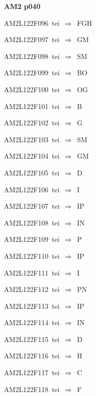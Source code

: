 \par\vfill\eject
{\bf\hfill AM2 p040\hfill\hbox{}}\par\bigskip
{\sixrm AM2L122F096\ {\sixit tei}\ }$\Rightarrow$\ FGH\par\smallskip
{\sixrm AM2L122F097\ {\sixit tei}\ }$\Rightarrow$\ GM\par\smallskip
{\sixrm AM2L122F098\ {\sixit tei}\ }$\Rightarrow$\ SM\par\smallskip
{\sixrm AM2L122F099\ {\sixit tei}\ }$\Rightarrow$\ BO\par\smallskip
{\sixrm AM2L122F100\ {\sixit tei}\ }$\Rightarrow$\ OG\par\smallskip
{\sixrm AM2L122F101\ {\sixit tei}\ }$\Rightarrow$\ B\par\smallskip
{\sixrm AM2L122F102\ {\sixit tei}\ }$\Rightarrow$\ G\par\smallskip
{\sixrm AM2L122F103\ {\sixit tei}\ }$\Rightarrow$\ SM\par\smallskip
{\sixrm AM2L122F104\ {\sixit tei}\ }$\Rightarrow$\ GM\par\smallskip
{\sixrm AM2L122F105\ {\sixit tei}\ }$\Rightarrow$\ D\par\smallskip
{\sixrm AM2L122F106\ {\sixit tei}\ }$\Rightarrow$\ I\par\smallskip
{\sixrm AM2L122F107\ {\sixit tei}\ }$\Rightarrow$\ IP\par\smallskip
{\sixrm AM2L122F108\ {\sixit tei}\ }$\Rightarrow$\ IN\par\smallskip
{\sixrm AM2L122F109\ {\sixit tei}\ }$\Rightarrow$\ P\par\smallskip
{\sixrm AM2L122F110\ {\sixit tei}\ }$\Rightarrow$\ IP\par\smallskip
{\sixrm AM2L122F111\ {\sixit tei}\ }$\Rightarrow$\ I\par\smallskip
{\sixrm AM2L122F112\ {\sixit tei}\ }$\Rightarrow$\ PN\par\smallskip
{\sixrm AM2L122F113\ {\sixit tei}\ }$\Rightarrow$\ IP\par\smallskip
{\sixrm AM2L122F114\ {\sixit tei}\ }$\Rightarrow$\ IN\par\smallskip
{\sixrm AM2L122F115\ {\sixit tei}\ }$\Rightarrow$\ D\par\smallskip
{\sixrm AM2L122F116\ {\sixit tei}\ }$\Rightarrow$\ H\par\smallskip
{\sixrm AM2L122F117\ {\sixit tei}\ }$\Rightarrow$\ C\par\smallskip
{\sixrm AM2L122F118\ {\sixit tei}\ }$\Rightarrow$\ F\par\smallskip

